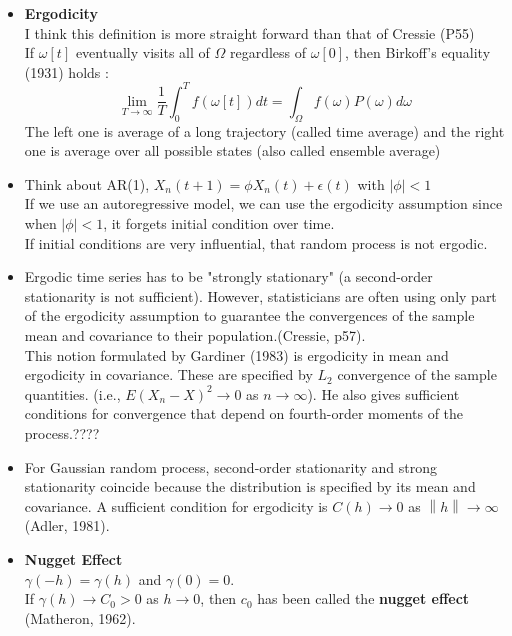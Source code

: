 \documentclass[11pt]{article}
\begin{document}
\begin{itemize}
\item 
\textbf{Ergodicity}\\
I think this definition is more straight forward than that of Cressie (P55)\\
If $\omega[t]$ eventually visits all of $\Omega$ regardless of $\omega[0]$, then Birkoff's equality (1931) holds :\\
$$\lim_{T \rightarrow \infty} \frac{1}{T} \int_{0}^{T}f(\omega [t])dt = \int_{\Omega}f(\omega)P(\omega)d\omega$$  
The left one is average of a long trajectory (called time average) and the right one is average over all possible states (also called ensemble average)\\


\item 
Think about AR(1), $X_n(t+1) = \phi X_n(t) + \epsilon(t)$ with $|\phi| <1$\\
If we use an autoregressive model, we can use the ergodicity assumption since when $|\phi| <1$, it forgets initial condition over time.\\
If initial conditions are very influential, that random process is not ergodic.\\

\item 
Ergodic time series has to be "strongly stationary" (a second-order stationarity is not sufficient). However, statisticians are often using only part of the ergodicity assumption to guarantee the convergences of the sample mean and covariance to their population.(Cressie, p57).\\
This notion formulated by Gardiner (1983) is ergodicity in mean and ergodicity in covariance. These are specified by $L_2$ convergence of the sample quantities. (i.e., $E(X_n - X)^2 \rightarrow 0$ as $n \rightarrow \infty$). {\color{red} He also gives sufficient conditions for convergence that depend on fourth-order moments of the process.????}\\

\item
For Gaussian random process, second-order stationarity and strong stationarity coincide because the distribution is specified by its mean and covariance. A sufficient condition for ergodicity is $C(h) \rightarrow 0$ as $\left \| h \right \| \rightarrow \infty$ (Adler, 1981).

\item
\textbf{Nugget Effect}\\
$\gamma(-h) = \gamma(h)$ and $\gamma(0)=0$.\\
If $\gamma(h) \rightarrow C_0 > 0$ as $h \rightarrow 0$, then $c_0$ has been called the \textbf{nugget effect} (Matheron, 1962).\\


\end{itemize}
\end{document}
